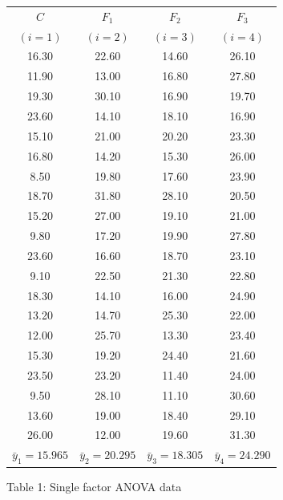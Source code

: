 \documentclass[letterpaper]{article}
\begin{document}
	\begin{center}
		\begin{tabular}{c c c c}
			\hline
			$C$ & $F_1$ & $F_2$ & $F_3$ \\
			$(i=1)$ & $(i=2)$ & $(i=3)$ & $(i=4)$ \\
			\hline
			16.30 & 22.60 & 14.60 & 26.10 \\
			11.90 & 13.00 & 16.80 & 27.80 \\
			19.30 & 30.10 & 16.90 & 19.70 \\
			23.60 & 14.10 & 18.10 & 16.90 \\
			15.10 & 21.00 & 20.20 & 23.30 \\
			16.80 & 14.20 & 15.30 & 26.00 \\
			8.50  & 19.80 & 17.60 & 23.90 \\
			18.70 & 31.80 & 28.10 & 20.50 \\
			15.20 & 27.00 & 19.10 & 21.00 \\
			9.80  & 17.20 & 19.90 & 27.80 \\
			23.60 & 16.60 & 18.70 & 23.10 \\
			9.10  & 22.50 & 21.30 & 22.80 \\
			18.30 & 14.10 & 16.00 & 24.90 \\
			13.20 & 14.70 & 25.30 & 22.00 \\
			12.00 & 25.70 & 13.30 & 23.40 \\
			15.30 & 19.20 & 24.40 & 21.60 \\
			23.50 & 23.20 & 11.40 & 24.00 \\
			9.50  & 28.10 & 11.10 & 30.60 \\
			13.60 & 19.00 & 18.40 & 29.10 \\
			26.00 & 12.00 & 19.60 & 31.30 \\
			\hline
			$\bar{y}_1=15.965$ & $\bar{y}_2=20.295$ & $\bar{y}_3=18.305$ & $\bar{y}_4=24.290$ \\
			\hline
		\end{tabular}
		
		Table 1: Single factor ANOVA data
	\end{center}
	
\end{document}
